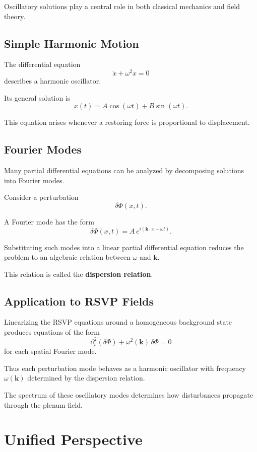 \documentclass[11pt, openany]{book}
\theoremstyle{plain}
\theoremstyle{definition}
\theoremstyle{remark}
\begin{document}
Oscillatory solutions play a central role in both classical mechanics
and field theory.

\subsection*{Simple Harmonic Motion}

The differential equation
\[
\ddot{x}+\omega^2 x=0
\]
describes a harmonic oscillator.

Its general solution is
\[
x(t)=A\cos(\omega t)+B\sin(\omega t).
\]

This equation arises whenever a restoring force is proportional to
displacement.

\subsection*{Fourier Modes}

Many partial differential equations can be analyzed by decomposing
solutions into Fourier modes.

Consider a perturbation
\[
\delta\Phi(x,t).
\]

A Fourier mode has the form
\[
\delta\Phi(x,t)
=
A\,e^{i(\mathbf{k}\cdot x-\omega t)}.
\]

Substituting such modes into a linear partial differential equation
reduces the problem to an algebraic relation between $\omega$ and
$\mathbf{k}$.

This relation is called the \textbf{dispersion relation}.

\subsection*{Application to RSVP Fields}

Linearizing the RSVP equations around a homogeneous background state
produces equations of the form
\[
\partial_t^2(\delta\Phi)+\omega^2(\mathbf{k})\,\delta\Phi=0
\]
for each spatial Fourier mode.

Thus each perturbation mode behaves as a harmonic oscillator with
frequency $\omega(\mathbf{k})$ determined by the dispersion relation.

The spectrum of these oscillatory modes determines how disturbances
propagate through the plenum field.

\section{Unified Perspective}
\end{document}
